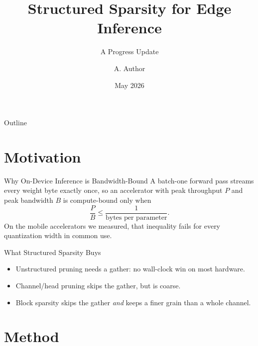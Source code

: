 \documentclass[11pt]{beamer}
\title{Structured Sparsity for Edge Inference}
\subtitle{A Progress Update}
\author{A. Author}
\institute{Department of Computer Science}
\date{May 2026}
\begin{document}
\begin{frame}
  \titlepage
\end{frame}

\begin{frame}{Outline}
  \tableofcontents
\end{frame}

\section{Motivation}

\begin{frame}{Why On-Device Inference is Bandwidth-Bound}
  A batch-one forward pass streams every weight byte exactly once, so an
  accelerator with peak throughput $P$ and peak bandwidth $B$ is
  compute-bound only when
  \[
    \frac{P}{B} \le \frac{1}{\text{bytes per parameter}}.
  \]
  \pause
  On the mobile accelerators we measured, that inequality fails for
  every quantization width in common use.
\end{frame}

\begin{frame}{What Structured Sparsity Buys}
  \begin{itemize}
    \item<1-> Unstructured pruning needs a gather: no wall-clock win on
      most hardware.
    \item<2-> Channel/head pruning skips the gather, but is coarse.
    \item<3-> Block sparsity skips the gather \emph{and} keeps a finer
      grain than a whole channel.
  \end{itemize}
\end{frame}

\section{Method}
\end{document}
